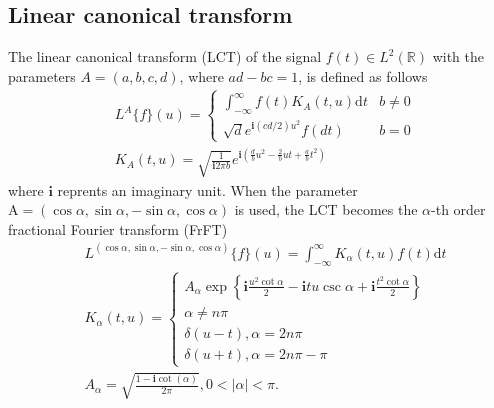 \documentclass[lettersize,journal]{IEEEtran}
\begin{document}
\subsection{Linear canonical transform}
The linear canonical transform (LCT) of the signal $f(t) \in L^2(\mathbb{R})$ with the parameters $A=(a,b,c,d)$, where $ad-bc=1$, is defined as follows \cite{pei2002, Healy2016, Pei2001}
\begin{align} \label{eq1}
	& L^{A}\{f\}(u) 
	= \begin{cases}  \int_{-\infty}^{\infty} f(t) K_{A}(t, u)\mathrm{d} t & b \neq 0 \\
		\sqrt{d}  e^{ \mathbf{i} \left(cd/2 \right)u^2} f(dt) & b=0\end{cases}  \\
	& K_{A}(t, u)= \sqrt{\frac{1}{\mathbf{i}2\pi b}} e^{ \mathbf{i} \left(\frac{d}{b} u^2-\frac{2}{b} u t+\frac{a}{b} t^2\right) }
\end{align}
where $\mathbf{i}$ reprents an imaginary unit.
When the parameter $\mathrm{A}=({\cos}\alpha, {\sin}\alpha, -{\sin}\alpha, {\cos}\alpha)$ is used, the LCT becomes the $\alpha$-th order fractional Fourier transform (FrFT)
\begin{align}
	&L^{({\cos}\alpha, {\sin}\alpha, -{\sin}\alpha, {\cos}\alpha)}\{f\}(u)=\int_{-\infty}^{\infty} K_{\alpha}(t, u) f(t) \mathrm{d} t \nonumber \\
	&
	K_{\alpha}(t, u)= 
	\left\{\begin{array}{l}
		A_\alpha \exp \left\{\mathbf{i} \frac{u^2\cot \alpha}{2} -\mathbf{i} t u \csc \alpha+\mathbf{i} \frac{t^2\cot \alpha }{2} \right\} \\
		\alpha \neq n \pi \\
		\delta(u-t), \alpha=2 n \pi \\
		\delta(u+t), \alpha=2 n \pi-\pi
	\end{array}\right.
	\nonumber \\
	& A_\alpha=\sqrt{\frac{1-\mathbf{i}\cot (\alpha)}{2 \pi}}, 0<|\alpha|<\pi .
\end{align}
\end{document}
